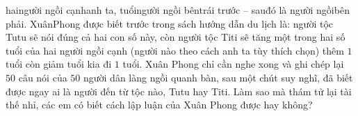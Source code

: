 \begin{multicols}{2}
hai\hspace*{123pt}\linebreak[6]người ngồi cạnh\hspace*{123pt}\linebreak[6]anh ta, tuổi\hspace*{123pt}\linebreak[6]người ngồi bên\hspace*{123pt}\linebreak[6]trái trước -- sau\hspace*{123pt}\linebreak[6]đó là người ngồi\hspace*{123pt}\linebreak[6]bên phải. Xuân\hspace*{123pt}\linebreak[6]Phong được biết trước trong sách hướng dẫn du lịch là: người tộc Tutu sẽ nói đúng cả hai con số này, còn người tộc Titi sẽ tăng một trong hai số tuổi của hai người ngồi cạnh (người nào theo cách anh ta tùy thích chọn) thêm $1$ tuổi còn giảm tuổi kia đi $1$ tuổi. Xuân Phong chỉ cần nghe xong và ghi chép lại $50$ câu nói  của $50$ người dân làng ngồi quanh bàn, sau một chút suy nghĩ, đã biết được ngay ai là người đến từ tộc nào, Tutu hay Titi. Làm sao mà thám tử lại tài thế nhỉ, các em có biết cách lập luận của Xuân Phong được hay không?
	
	\vspace*{280pt}
\end{multicols}
\newpage
\begingroup
{} 
